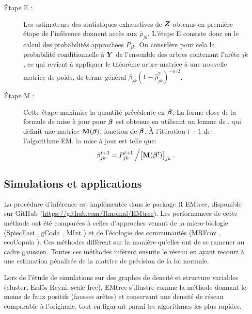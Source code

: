 \begin{description}
\item[Étape E :] Les estimateurs des statistiques exhaustives de ${\boldsymbol{Z}}$ obtenus en première étape de l'inférence donnent accès aux $\widehat{\rho}_{jk}$. L'étape E consiste donc en le calcul des probabilités approchées $P_{jk}$. On considère pour cela la probabilité conditionnelle à ${\boldsymbol{Y}}$ de l'ensemble des arbres contenant l'arête $jk$, ce qui revient à appliquer le théorème arbre-matrice à une nouvelle matrice de poids, de terme général $\beta_{jk}(1-\widehat{\rho}_{jk}^2)^{-n/2}$.

\item[Étape M :] Cette étape  maximise la quantité précédente en ${\boldsymbol{\beta}}$. La forme close de la formule de mise à jour  pour ${\boldsymbol{\beta}}$ est obtenue  en utilisant un lemme de \citet{MeilaJaak}, qui définit une matrice ${\bf M}({\boldsymbol{\beta}})$, fonction de ${\boldsymbol{\beta}}$. À l'itération $t+1$ de l'algorithme EM, la mise à jour est telle que:
$$\beta_{jk}^{t+1} = P_{jk}^{t+1} \left/ \left[{\bf M}({\boldsymbol{\beta}}^t)\right]_{jk} \right..$$
\end{description}

\subsection*{Simulations et applications}
La procédure d'inférence est implémentée dans le package R  EMtree, disponible sur GitHub (\url{https://github.com/Rmomal/EMtree}). Les performances de cette méthode ont été comparées à celles d'approches venant de la micro-biologie (SpiecEasi \citep{kurtz}, gCoda \citep{gcoda}, MInt \citep{MInt}) et de l'écologie des communautés (MRFcov \citep{CWL18}, ecoCopula \citep{PWT19}). Ces méthodes diffèrent sur la manière qu'elles ont de se ramener au cadre gaussien. Toutes ces méthodes infèrent ensuite le réseau en ayant recourt à une estimation pénalisée de la matrice de précision de la loi normale. %

Lors de l'étude de simulations sur des graphes de densité et structure variables (cluster, Erdös-Reyni, scale-free), EMtree s'illustre comme la méthode  donnant le moins de faux positifs (fausses arêtes) et conservant une densité de réseau comparable à l'originale, tout en figurant parmi les algorithmes les plus rapides. %

